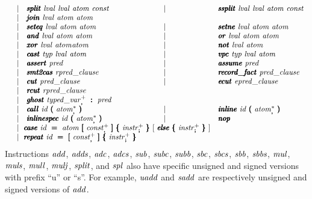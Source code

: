 \documentclass{article}
\begin{document}
\[\begin{array}{rclcl}
         & \mid & \pmb\isplit\ \lval\ \lval\ \atom\ \const 
         & \mid & \pmb\issplit\ \lval\ \lval\ \atom\ \const \\
         & \mid & \pmb\ijoin\ \lval\ \atom\ \atom \\
         & \mid & \pmb\iseteq\ \lval\ \atom\ \atom
         & \mid & \pmb\isetne\ \lval\ \atom\ \atom \\
         & \mid & \pmb\iand\ \lval\ \atom\ \atom
         & \mid & \pmb\ior\ \lval\ \atom\ \atom \\
         & \mid & \pmb\ixor\ \lval\ \atom \atom
         & \mid & \pmb\inot\ \lval\ \atom \\
         & \mid & \pmb\icast\ \typ\ \lval\ \atom
         & \mid & \pmb\ivpc\ \typ\ \lval\ \atom \\
         & \mid & \pmb\iassert\ \pred
         & \mid & \pmb\iassume\ \pred \\
         & \mid & \pmb\ismttocas\ \rpredclause
         & \mid & \pmb\irecordfact\ \predclause \\
         & \mid & \pmb\icut\ \predclause
         & \mid & \pmb\iecut\ \epredclause \\
         & \mid & \pmb\ircut\ \rpredclause \\
         & \mid & \pmb\ighost\ \tvar_{\pmb,}^+\ \pmb{:}\ \pred \\
         & \mid & \pmb\icall\ \id\ \pmb{(}\ \atom_{\pmb,}^*\ \pmb{)}
         & \mid & \pmb\iinline\ \id\ \pmb{(}\ \atom_{\pmb,}^*\ \pmb{)} \\
         & \mid & \pmb\iinlinespec\ \id\ \pmb{(}\ \atom_{\pmb,}^*\ \pmb{)}
         & \mid & \pmb\inop \\
         & \multicolumn{3}{l}{\mid\ \pmb\icase\ \id\ \pmb{=}\ \atom\
           \pmb{[}\ \const_{\pmb,}^+\ \pmb{]}\ \pmb\{\ \instr_{\pmb;}^+\ \pmb\}
           \ [\ \pmb\ielse\ \pmb\{\ \instr_{\pmb;}^+\ \pmb\}\ ]} \\
         & \multicolumn{3}{l}{\mid\ \pmb\irepeat\ \id\ \pmb{=}\
           \pmb{[}\ \const_{\pmb,}^+\ \pmb{]}\ \pmb\{\ \instr_{\pmb;}^+\ \pmb\}} \\
\end{array}
\]
Instructions $\mathit{add}$, $\mathit{adds}$, $\mathit{adc}$, $\mathit{adcs}$, $\mathit{sub}$, $\mathit{subc}$,
$\mathit{subb}$, $\mathit{sbc}$, $\mathit{sbcs}$, $\mathit{sbb}$, $\mathit{sbbs}$, $\mathit{mul}$, $\mathit{muls}$,
$\mathit{mull}$, $\mathit{mulj}$, $\mathit{split}$, and $\mathit{spl}$ also have specific unsigned
and signed versions with prefix ``u'' or ``s''.
For example, $\mathit{uadd}$ and $\mathit{sadd}$ are respectively unsigned and
signed versions of $\mathit{add}$.
\end{document}
